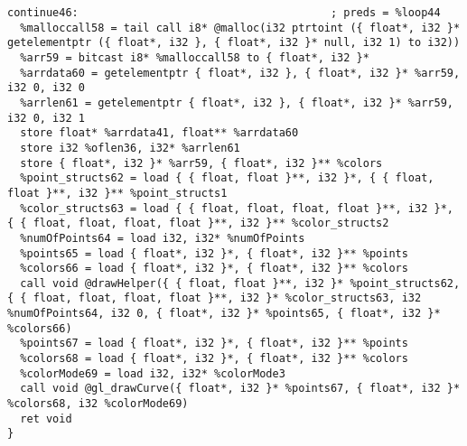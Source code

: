 \documentclass[main.tex]{subfiles}
\begin{document}
{\begin{lstlisting}
continue46:                                       ; preds = %loop44
  %malloccall58 = tail call i8* @malloc(i32 ptrtoint ({ float*, i32 }* getelementptr ({ float*, i32 }, { float*, i32 }* null, i32 1) to i32))
  %arr59 = bitcast i8* %malloccall58 to { float*, i32 }*
  %arrdata60 = getelementptr { float*, i32 }, { float*, i32 }* %arr59, i32 0, i32 0
  %arrlen61 = getelementptr { float*, i32 }, { float*, i32 }* %arr59, i32 0, i32 1
  store float* %arrdata41, float** %arrdata60
  store i32 %oflen36, i32* %arrlen61
  store { float*, i32 }* %arr59, { float*, i32 }** %colors
  %point_structs62 = load { { float, float }**, i32 }*, { { float, float }**, i32 }** %point_structs1
  %color_structs63 = load { { float, float, float, float }**, i32 }*, { { float, float, float, float }**, i32 }** %color_structs2
  %numOfPoints64 = load i32, i32* %numOfPoints
  %points65 = load { float*, i32 }*, { float*, i32 }** %points
  %colors66 = load { float*, i32 }*, { float*, i32 }** %colors
  call void @drawHelper({ { float, float }**, i32 }* %point_structs62, { { float, float, float, float }**, i32 }* %color_structs63, i32 %numOfPoints64, i32 0, { float*, i32 }* %points65, { float*, i32 }* %colors66)
  %points67 = load { float*, i32 }*, { float*, i32 }** %points
  %colors68 = load { float*, i32 }*, { float*, i32 }** %colors
  %colorMode69 = load i32, i32* %colorMode3
  call void @gl_drawCurve({ float*, i32 }* %points67, { float*, i32 }* %colors68, i32 %colorMode69)
  ret void
}


\end{lstlisting}}
\end{document}
